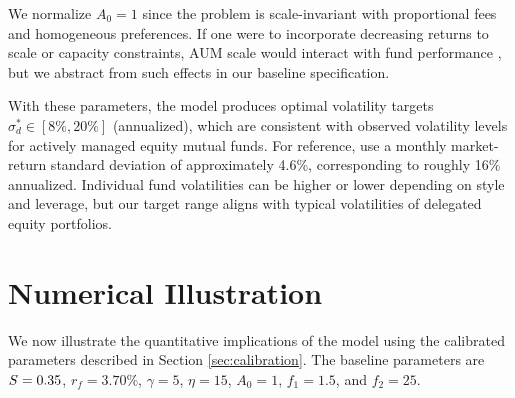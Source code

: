 We normalize \(A_0=1\) since the problem is scale-invariant with
proportional fees and homogeneous preferences. If one were to
incorporate decreasing returns to scale or capacity constraints, AUM
scale would interact with fund performance \citep[][]{berk2004mutual},
but we abstract from such effects in our baseline specification.

With these parameters, the model produces optimal volatility targets
\(\sigma_d^*\in[8\%,20\%]\) (annualized), which are consistent with
observed volatility levels for actively managed equity mutual funds. For
reference, \citet[][]{barras2010false} use a monthly market-return
standard deviation of approximately 4.6\%, corresponding to roughly 16\%
annualized. Individual fund volatilities can be higher or lower
depending on style and leverage, but our target range aligns with
typical volatilities of delegated equity portfolios.

\section{Numerical Illustration}\label{sec:numerical}

We now illustrate the quantitative implications of the model using the
calibrated parameters described in Section \ref{sec:calibration}. The
baseline parameters are \(S=0.35\), \(r_f=3.70\%\), \(\gamma=5\),
\(\eta=15\), \(A_0=1\), \(f_1=1.5\), and \(f_2=25\).

